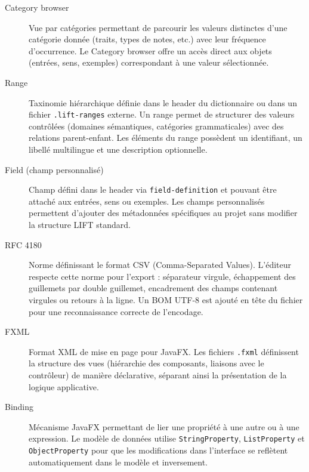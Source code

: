 \documentclass[11pt,twoside,openany]{book}
\begin{document}
\begin{description}
\item[Category browser] Vue par catégories permettant de parcourir les valeurs distinctes d'une catégorie donnée (traits, types de notes, etc.) avec leur fréquence d'occurrence. Le Category browser offre un accès direct aux objets (entrées, sens, exemples) correspondant à une valeur sélectionnée.

\item[Range] Taxinomie hiérarchique définie dans le header du dictionnaire ou dans un fichier \texttt{.lift-ranges} externe. Un range permet de structurer des valeurs contrôlées (domaines sémantiques, catégories grammaticales) avec des relations parent-enfant. Les éléments du range possèdent un identifiant, un libellé multilingue et une description optionnelle.

\item[Field (champ personnalisé)] Champ défini dans le header via \texttt{field-definition} et pouvant être attaché aux entrées, sens ou exemples. Les champs personnalisés permettent d'ajouter des métadonnées spécifiques au projet sans modifier la structure LIFT standard.

\item[RFC 4180] Norme définissant le format CSV (Comma-Separated Values). L'éditeur respecte cette norme pour l'export : séparateur virgule, échappement des guillemets par double guillemet, encadrement des champs contenant virgules ou retours à la ligne. Un BOM UTF-8 est ajouté en tête du fichier pour une reconnaissance correcte de l'encodage.

\item[FXML] Format XML de mise en page pour JavaFX. Les fichiers \texttt{.fxml} définissent la structure des vues (hiérarchie des composants, liaisons avec le contrôleur) de manière déclarative, séparant ainsi la présentation de la logique applicative.

\item[Binding] Mécanisme JavaFX permettant de lier une propriété à une autre ou à une expression. Le modèle de données utilise \texttt{StringProperty}, \texttt{ListProperty} et \texttt{ObjectProperty} pour que les modifications dans l'interface se reflètent automatiquement dans le modèle et inversement.
\end{description}
\end{document}

